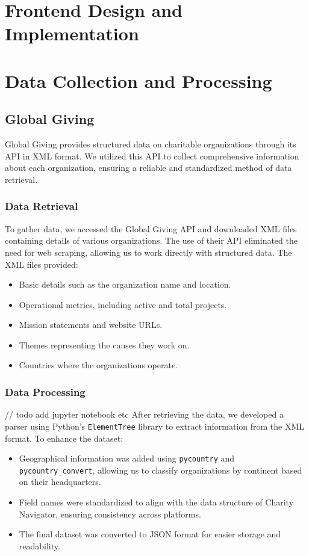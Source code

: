 \documentclass[unicode,9pt,a4paper,oneside,numbers=endperiod,openany]{scrartcl}
\begin{document}
\section{Frontend Design and Implementation}

\section{Data Collection and Processing}

\subsection{Global Giving}
Global Giving provides structured data on charitable organizations through its API in XML format. We utilized this API to collect comprehensive information about each organization, ensuring a reliable and standardized method of data retrieval.

\subsubsection{Data Retrieval}
To gather data, we accessed the Global Giving API and downloaded XML files containing details of various organizations. The use of their API eliminated the need for web scraping, allowing us to work directly with structured data. The XML files provided:
\begin{itemize}
\item Basic details such as the organization name and location.
\item Operational metrics, including active and total projects.
\item Mission statements and website URLs.
\item Themes representing the causes they work on.
\item Countries where the organizations operate.
\end{itemize}

\subsubsection{Data Processing}

// todo add jupyter notebook etc
After retrieving the data, we developed a parser using Python's \texttt{ElementTree} library to extract information from the XML format. To enhance the dataset:
\begin{itemize}
\item Geographical information was added using \texttt{pycountry} and \texttt{pycountry\_convert}, allowing us to classify organizations by continent based on their headquarters.
\item Field names were standardized to align with the data structure of Charity Navigator, ensuring consistency across platforms.
\item The final dataset was converted to JSON format for easier storage and readability.
\end{itemize}
\end{document}
